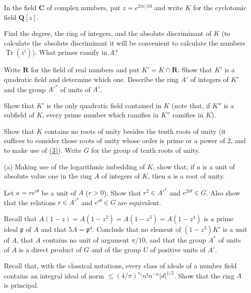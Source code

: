 


In the field $\mathbf{C}$ of complex numbers, put $z=e^{2\pi i/10}$ and
write $K$ for the cyclotomic field $\mathbf{Q}[z]$.

 Find the degree, the ring of integers, and the absolute
discriminant of $K$ (to calculate the absolute discriminant it will be
convenient to calculate the numbers $\operatorname{Tr}(z^{i})$).
What primes ramify in $A$?

 Write $\mathbf{R}$ for the field of real numbers and put
$K'=K\cap\mathbf{R}$. Show that $K'$ is a quadratic field and determine
which one. Describe the ring $A'$ of integers of $K'$ and the group
$A'^{*}$ of units of $A'$.

 Show that $K'$ is the only quadratic field contained in $K$
(note that, if $K''$ is a subfield of $K$, every prime number which ramifies
in $K''$ ramifies in $K$).

 Show that $K$ contains no roots of unity besides the tenth roots
of unity (it suffices to consider those roots of unity whose order is prime
or a power of $2$, and to make use of \hyperref[exer:R1.3]{(3)}). Write $G$ for the group of tenth
roots of unity.

 (a) Making use of the logarithmic imbedding of $K$, show that,
if $a$ is a unit of absolute value one in the ring $A$ of integers of $K$,
then $a$ is a root of unity.
\begin{alist}
\item Let $a=re^{i\theta}$ be a unit of $A$ ($r>0$). Show that
$r^{2}\in A'^{*}$ and $e^{2i\theta}\in G$. Also show that the relations
$r\in A'^{*}$ and $e^{i\theta}\in G$ are equivalent.
\item Recall that
$A(1-z)=A(1-z^{2})=A(1-z^{3})=A(1-z^{4})$ is a prime ideal
$\mathfrak{p}$ of $A$ and that $5A=\mathfrak{p}^{4}$. Conclude that no
element of $(1-z^{3})K'$ is a unit of $A$, that $A$ contains no unit of
argument $\pi/10$, and that the group $A^{*}$ of units of $A$ is a direct
product of $G$ and of the group $U$ of positive units of $A'$.
\end{alist}

 Recall that, with the classical notations, every class of ideals
of a number field contains an integral ideal of norm
$\leq(4/\pi)^{r_{2}}n!n^{-n}|d|^{1/2}$. Show that the ring $A$ is principal.

